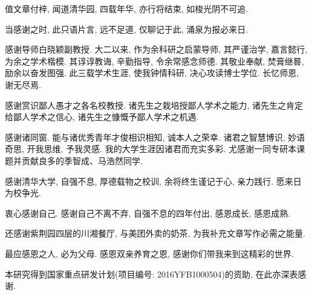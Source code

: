 \begin{acknowledgement}
值文章付梓, 闻道清华园, 四载年华, 亦行将结束, 如梭光阴不可追.

当感谢之时, 此只语片言, 远不足道, 仅聊记于此, 涌泉为报必来日.

感谢导师白晓颖副教授. 大二以来, 作为余科研之启蒙导师, 其严谨治学, 嘉言懿行, 为余之学术楷模. 其谆谆教诲, 辛勤指导, 令余常感念师德. 其敬业奉献, 焚膏继晷, 励余以奋发图强. 此三载学术生涯, 使我钟情科研, 决心攻读博士学位. 长忆师恩, 谢无尽焉.

感谢赏识鄙人愚才之各名校教授. 诸先生之栽培授鄙人学术之能力, 诸先生之肯定给鄙人学术之信心, 诸先生之慷慨予鄙人学术之机遇.

感谢诸同窗. 能与诸优秀青年才俊相识相知, 诚本人之荣幸. 诸君之智慧博识, 妙语奇思, 开我思维, 予我灵感. 我的大学生涯因诸君而充实多彩. 尤感谢一同专研本课题并贡献良多的季智成、马浩然同学.

感谢清华大学, 自强不息, 厚德载物之校训, 余将终生谨记于心, 亲力践行. 愿来日为校争光.

衷心感谢自己. 感谢自己不离不弃, 自强不息的四年付出, 感恩成长, 感恩成熟.

还感谢紫荆园四层的川湘餐厅, 与美团外卖的奶茶, 为我补充文章写作必需之能量.

最应感恩之人, 必为父母. 感恩双亲养育之恩, 感谢你们带我来到这精彩的世界.

本研究得到国家重点研发计划(项目编号: 2016YFB1000504)的资助, 在此亦深表感谢.

\end{acknowledgement}
